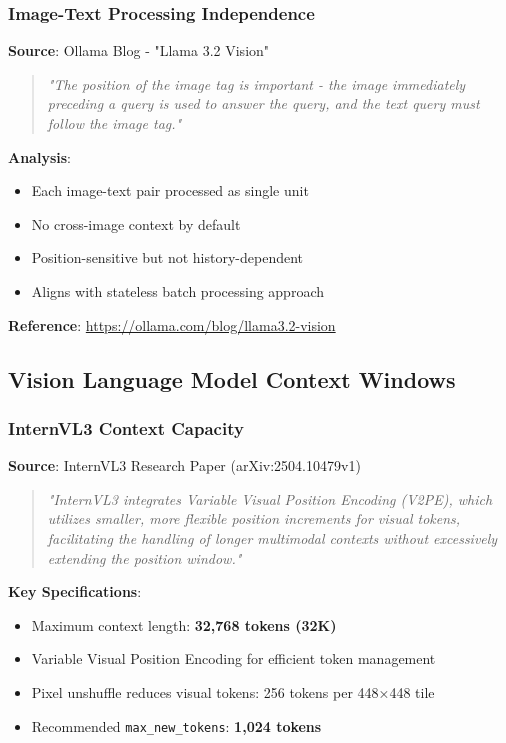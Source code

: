 \documentclass[11pt,a4paper]{article}
\begin{document}
\subsubsection{Image-Text Processing Independence}

\textbf{Source}: Ollama Blog - "Llama 3.2 Vision"

\begin{quote}
\textit{"The position of the image tag is important - the image immediately preceding a query is used to answer the query, and the text query must follow the image tag."}
\end{quote}

\textbf{Analysis}:
\begin{itemize}[leftmargin=*]
    \item Each image-text pair processed as single unit
    \item No cross-image context by default
    \item Position-sensitive but not history-dependent
    \item Aligns with stateless batch processing approach
\end{itemize}

\textbf{Reference}: \url{https://ollama.com/blog/llama3.2-vision}

\subsection{Vision Language Model Context Windows}

\subsubsection{InternVL3 Context Capacity}

\textbf{Source}: InternVL3 Research Paper (arXiv:2504.10479v1)

\begin{quote}
\textit{"InternVL3 integrates Variable Visual Position Encoding (V2PE), which utilizes smaller, more flexible position increments for visual tokens, facilitating the handling of longer multimodal contexts without excessively extending the position window."}
\end{quote}

\textbf{Key Specifications}:
\begin{itemize}[leftmargin=*]
    \item Maximum context length: \textbf{32,768 tokens (32K)}
    \item Variable Visual Position Encoding for efficient token management
    \item Pixel unshuffle reduces visual tokens: 256 tokens per 448×448 tile
    \item Recommended \texttt{max\_new\_tokens}: \textbf{1,024 tokens}
\end{itemize}
\end{document}
